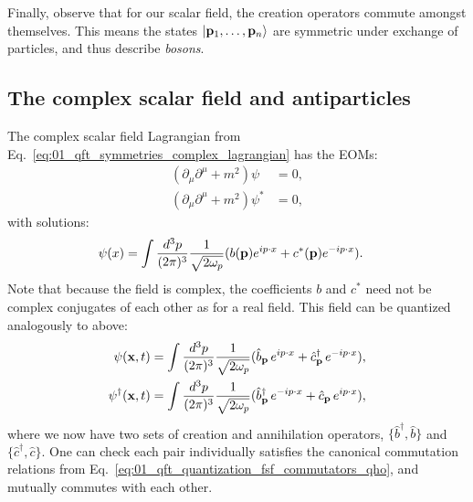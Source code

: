 Finally, observe that for our scalar field, the creation operators commute amongst themselves. 
This means the states $\ket{\mathbf{p}_1, \ldots, \mathbf{p}_n}$ are symmetric under exchange of particles, and thus describe \textit{bosons}.

\subsection{The complex scalar field and antiparticles}
\label{sec:01_qft_quantization_complex}

The complex scalar field Lagrangian from Eq.~\ref{eq:01_qft_symmetries_complex_lagrangian} has the EOMs:
\begin{equation}
    \label{eq:01_qft_quantization_complex_eoms}
    \begin{split}
        (\partial_\mu\partial^\mu + m^2)\psi &= 0, \\
        (\partial_\mu\partial^\mu + m^2)\psi^* &= 0,
    \end{split}
\end{equation}
with solutions:
\begin{equation}
    \label{eq:01_qft_quantization_complex_solutions}
    \begin{split}
        \psi(x) &= \int \frac{d^3p}{(2\pi)^3} \frac{1}{\sqrt{2\omega_p}} (b(\mathbf{p})e^{ip\cdot x} + c^*(\mathbf{p}) e^{-ip\cdot x}).
    \end{split}
\end{equation}
Note that because the field is complex, the coefficients $b$ and $c^*$ need not be complex conjugates of each other as for a real field.
This field can be quantized analogously to above:
\begin{equation}
    \label{eq:01_qft_quantization_complex_fields}
    \begin{split}
        \psi(\mathbf{x}, t) &= \int \frac{d^3p}{(2\pi)^3} \frac{1}{\sqrt{2\omega_p}} (\hat b_{\mathbf{p}}\,e^{ip\cdot x} + \hat c^\dagger_{\mathbf{p}}\, e^{-ip\cdot x}), \\
        \psi^\dagger(\mathbf{x}, t) &= \int \frac{d^3p}{(2\pi)^3} \frac{1}{\sqrt{2\omega_p}} (\hat b^\dagger_{\mathbf{p}}\,e^{-ip\cdot x} + \hat c_{\mathbf{p}}\, e^{ip\cdot x}),
    \end{split}
\end{equation}
where we now have two sets of creation and annihilation operators, $\{\hat b^\dagger, \hat b\}$ and $\{\hat c^\dagger, \hat c\}$.
One can check each pair individually satisfies the canonical commutation relations from Eq.~\ref{eq:01_qft_quantization_fsf_commutators_qho}, and mutually commutes with each other.

